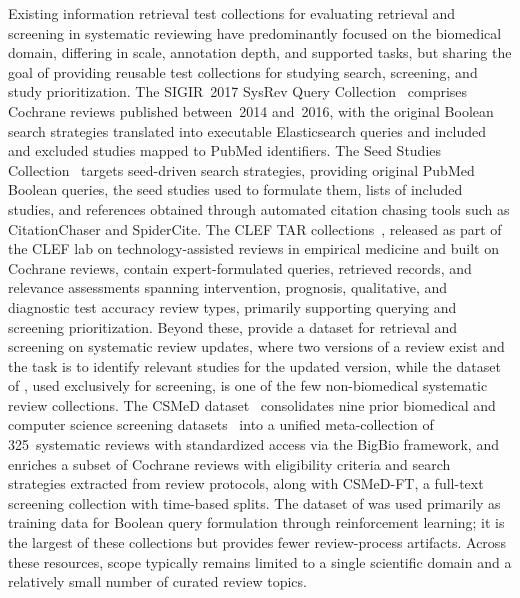 Existing information retrieval test collections for evaluating retrieval and screening in systematic reviewing have predominantly focused on the biomedical domain, differing in scale, annotation depth, and supported tasks, but sharing the goal of providing reusable test collections for studying search, screening, and study prioritization. The SIGIR~2017 SysRev Query Collection~\cite{scells:2017} comprises Cochrane reviews published between~2014 and~2016, with the original Boolean search strategies translated into executable Elasticsearch queries and included and excluded studies mapped to PubMed identifiers. The Seed Studies Collection~\cite{wang:2022} targets seed-driven search strategies, providing original PubMed Boolean queries, the seed studies used to formulate them, lists of included studies, and references obtained through automated citation chasing tools such as CitationChaser and SpiderCite. The CLEF TAR collections~\cite{kanoulas:2017,kanoulas:2018,kanoulas:2019}, released as part of the CLEF lab on technology-assisted reviews in empirical medicine and built on Cochrane reviews, contain expert-formulated queries, retrieved records, and relevance assessments spanning intervention, prognosis, qualitative, and diagnostic test accuracy review types, primarily supporting querying and screening prioritization. Beyond these, \citet{alharbi:2019} provide a dataset for retrieval and screening on systematic review updates, where two versions of a review exist and the task is to identify relevant studies for the updated version, while the dataset of \citet{hannousse:2021}, used exclusively for screening, is one of the few non-biomedical systematic review collections. The CSMeD dataset~\cite{kusa:2023} consolidates nine prior biomedical and computer science screening datasets~\cite{cohen:2006,wallace:2010,howard:2016,scells:2017,kanoulas:2017,kanoulas:2018,kanoulas:2019,alharbi:2019,hannousse:2021} into a unified meta-collection of 325~systematic reviews with standardized access via the BigBio framework, and enriches a subset of Cochrane reviews with eligibility criteria and search strategies extracted from review protocols, along with CSMeD-FT, a full-text screening collection with time-based splits. The dataset of \citet{wang:2025b} was used primarily as training data for Boolean query formulation through reinforcement learning; it is the largest of these collections but provides fewer review-process artifacts. Across these resources, scope typically remains limited to a single scientific domain and a relatively small number of curated review topics.

